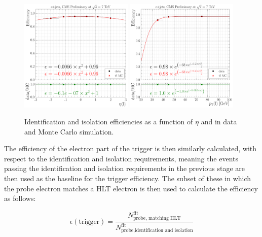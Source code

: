 \begin{figure}[hbtp]
    \centering
      \includegraphics[width=0.48\textwidth]{Chapters/04_Analysis/04b_XSections/images/lepton_scale_factors/CBConvolution/electron/efficiency_eta_id_iso}\hfill
      \includegraphics[width=0.48\textwidth]{Chapters/04_Analysis/04b_XSections/images/lepton_scale_factors/CBConvolution/electron/efficiency_pt_id_iso}
      \caption{Identification and isolation efficiencies as a function of $\eta$ and \pt in data and \ttbar
      Monte Carlo simulation.}
     \label{fig:electron_id_iso_efficiencies_wrt_eta_pt}
\end{figure}

The efficiency of the electron part of the trigger is then similarly calculated, with respect to the
identification and isolation requirements, meaning the events passing the identification and isolation
requirements in the previous stage are then used as the baseline for the trigger efficiency. The subset of
these in which the probe electron matches a HLT electron is then used to calculate the efficiency as follows:

\begin{equation}
\epsilon(\text{trigger}) = \frac{N^{\text{fit}}_{\text{probe, matching HLT}}}{N^{\text{fit}}_{\text{probe,identification and isolation}}}
\end{equation}

